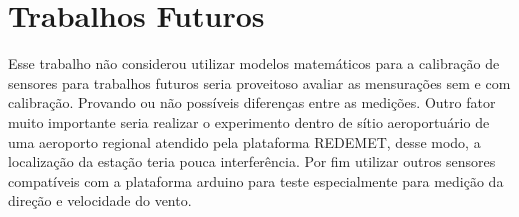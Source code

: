 \section{Trabalhos Futuros}\label{trabalhosFuturos}

Esse trabalho não considerou utilizar modelos matemáticos para a calibração de sensores para trabalhos futuros seria proveitoso avaliar as mensurações sem e com calibração. Provando ou não possíveis diferenças entre as medições. Outro fator muito importante seria realizar o experimento dentro de sítio aeroportuário de uma aeroporto regional atendido pela plataforma REDEMET, desse modo, a localização da estação teria pouca interferência. Por fim utilizar outros sensores compatíveis com a plataforma arduino para teste especialmente para medição da direção e velocidade do vento.


